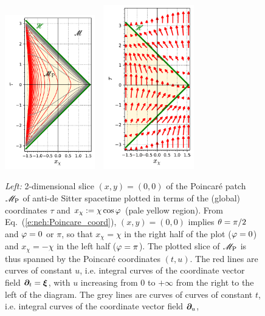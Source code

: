 \begin{figure}
\centerline{\includegraphics[width=0.35\textwidth]{neh_AdS_Poincare_patch.pdf}\ \qquad \
\includegraphics[width=0.35\textwidth]{neh_AdS_Killing_vec.pdf}
}
\caption[]{\label{f:neh:AdS_example} \footnotesize
\emph{Left:} 2-dimensional slice $(x,y)=(0,0)$ of the Poincaré patch $\mathscr{M}_{\rm P}$ of anti-de Sitter spacetime plotted in terms of the (global) coordinates $\tau$ and
$x_\chi := \chi \cos\varphi$ (pale yellow region). From Eq.~(\ref{e:neh:Poincare_coord}),
$(x,y)=(0,0)$ implies $\theta=\pi/2$ and $\varphi=0$ or $\pi$, so that $x_\chi = \chi$
in the right half of the plot ($\varphi=0$) and $x_\chi = - \chi$ in the left half
($\varphi=\pi$). The plotted slice of $\mathscr{M}_{\rm P}$ is thus spanned by the
Poincaré coordinates $(t,u)$.
The red lines are curves of constant $u$, i.e. integral curves of
the coordinate vector field $\bm{\partial}_t = \bm{\xi}$, with $u$ increasing from $0$ to $+\infty$
from the right to the left of the diagram. The grey lines are
curves of curves
of constant $t$, i.e. integral curves of the coordinate vector field $\bm{\partial}_u$,
}
\end{figure}

